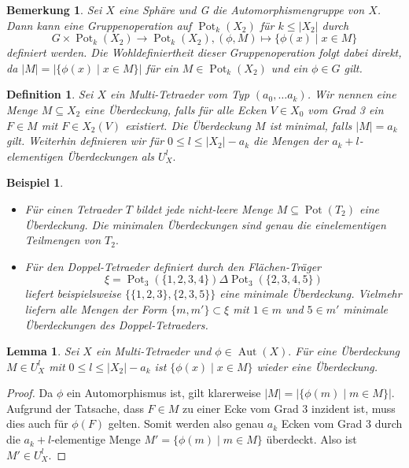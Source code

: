 \documentclass[12pt,titlepage,twoside,cleardoublepage]{article}
\theoremstyle{nummermitklammern}
\newtheorem{lemma}[temp]{Lemma}
\newtheorem{bsp}[temp]{Beispiel}
\newtheorem{definition}[temp]{Definition}
\newtheorem{bemerkung}[temp]{Bemerkung}
\newtheorem{definition}[zahl]{Definition}
\newtheorem{lemma}[zahl]{Lemma}
\newtheorem{bsp}[zahl]{Beispiel}
\newtheorem{bemerkung}[zahl]{Bemerkung}
\numberwithin{equation}{section}
\DeclareMathOperator{\Aut}{Aut}
\DeclareMathOperator{\Pot}{Pot}
\begin{document}
\begin{bemerkung}\label{bemgruppe}
Sei $X$ eine Sphäre und G die Automorphismengruppe von $X$. Dann kann eine Gruppenoperation auf $\Pot_k(X_2)$ für $k \leq \vert X_2 \vert  $ durch 
\[
G\times \Pot_k(X_2) \to \Pot_k(X_2),(\phi , M)\mapsto \{\phi(x)\mid x\in M\}
\]
definiert werden. Die Wohldefiniertheit dieser Gruppenoperation folgt dabei direkt, da $\vert M\vert=\vert\{\phi (x)\mid x\in M\}\vert$ für ein $M\in \Pot_k(X_2)$ und ein $\phi\in G$ gilt.
\end{bemerkung}
\begin{definition}
Sei $X$ ein Multi-Tetraeder vom Typ $(a_0,\ldots a_k)$. Wir nennen eine Menge $M\subseteq X_2$ eine \emph{Überdeckung}, falls für alle Ecken $V\in X_0$ vom Grad 3 ein $F\in M$ mit $F\in X_2(V)$ existiert. Die Überdeckung $M$ ist \emph{minimal}, falls $\vert M\vert=a_k$ gilt.
Weiterhin definieren wir für $0\leq l\leq \vert X_2\vert -a_k$ die Mengen der $a_k+l$-elementigen Überdeckungen als
 $U_X^l.$ 
\end{definition}
\begin{bsp}
\begin{itemize}
\item Für einen Tetraeder $T$ bildet jede nicht-leere Menge $ M \subseteq \Pot(T_2)$ eine Überdeckung. Die minimalen Überdeckungen sind genau die einelementigen Teilmengen von $T_2.$
\item Für den Doppel-Tetraeder definiert durch den Flächen-Träger 
\[
\xi=\Pot_3(\{1,2,3,4\})\Delta \Pot_3(\{2,3,4,5\})
\]
liefert beispielsweise $\{\{1,2,3\},\{2,3,5\}\}$ eine minimale Überdeckung. Vielmehr liefern alle Mengen der Form $\{m,m'\}\subset \xi$ mit $1\in m$ und $5\in m'$ minimale Überdeckungen des Doppel-Tetraeders.
\end{itemize}
\end{bsp}
\begin{lemma}
Sei $X$ ein Multi-Tetraeder und $\phi \in \Aut(X).$ Für eine Überdeckung $M\in U_X^l$ mit  $0\leq l\leq \vert X_2\vert -a_k$ ist $\{\phi(x)\mid x\in M\}$ wieder eine Überdeckung. \end{lemma}
\begin{proof}
 Da $\phi$ ein Automorphismus ist, gilt
klarerweise $\vert M\vert =\vert\{\phi(m)\mid m\in M\}\vert$.
 Aufgrund der Tatsache, dass $F\in M$ zu einer Ecke vom Grad 3 inzident ist, muss dies auch für $\phi(F)$ gelten. Somit werden also genau $a_k$ Ecken vom Grad 3 durch die $a_k+l$-elementige Menge $M'=\{\phi(m)\mid m\in M\}$ überdeckt. Also ist $M'\in U^l_X.$
\end{proof}
\end{document}
